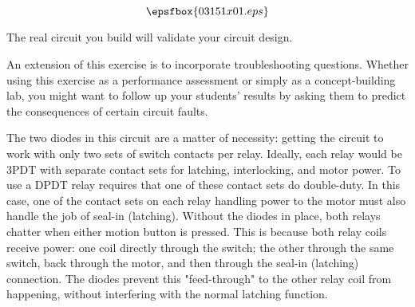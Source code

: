 

$$\epsfbox{03151x01.eps}$$

\vfil \eject






The real circuit you build will validate your circuit design.







An extension of this exercise is to incorporate troubleshooting questions.  Whether using this exercise as a performance assessment or simply as a concept-building lab, you might want to follow up your students' results by asking them to predict the consequences of certain circuit faults.

The two diodes in this circuit are a matter of necessity: getting the circuit to work with only two sets of switch contacts per relay.  Ideally, each relay would be 3PDT with separate contact sets for latching, interlocking, and motor power.  To use a DPDT relay requires that one of these contact sets do double-duty.  In this case, one of the contact sets on each relay handling power to the motor must also handle the job of seal-in (latching).  Without the diodes in place, both relays chatter when either motion button is pressed.  This is because both relay coils receive power: one coil directly through the switch; the other through the same switch, back through the motor, and then through the seal-in (latching) connection.  The diodes prevent this "feed-through" to the other relay coil from happening, without interfering with the normal latching function.





